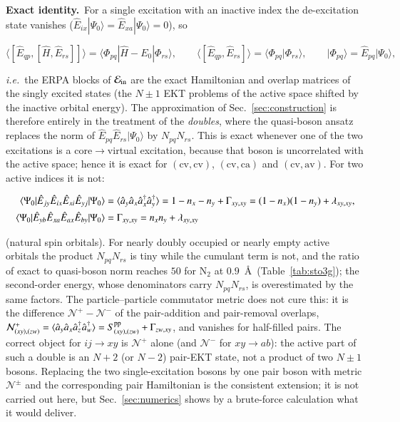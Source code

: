\documentclass[aip,jcp,reprint,noshowkeys,superscriptaddress]{revtex4-1}
\newcommand{\ie}{\textit{i.e.}}
\newcommand{\cre}[1]{\Hat{a}_{#1}^{\dag}}
\newcommand{\ani}[1]{\Hat{a}_{#1}}
\newcommand{\pp}{\text{pp}}
\newcommand{\scv}{\text{cv}}
\newcommand{\sca}{\text{ca}}
\newcommand{\sav}{\text{av}}
\newcommand{\Exact}{\textbf{Exact identity.}\ }
\begin{document}
\Exact For a single excitation with an inactive index the de-excitation
state vanishes ($\hat E_{ix}|\Psi_0\rangle=\hat E_{xa}|\Psi_0\rangle=0$), so
\begin{widetext}
\begin{equation}
  \langle[\hat E_{qp},[\hat H,\hat E_{rs}]]\rangle
  =\langle\Phi_{pq}|\hat H-E_0|\Phi_{rs}\rangle ,\qquad
  \langle[\hat E_{qp},\hat E_{rs}]\rangle=\langle\Phi_{pq}|\Phi_{rs}\rangle,
  \qquad |\Phi_{pq}\rangle=\hat E_{pq}|\Psi_0\rangle ,
  \label{eq:tda-exact}
\end{equation}
\end{widetext}
\ie\ the ERPA blocks of $\mathcal E_{\rm in}$ are the exact Hamiltonian and
overlap matrices of the singly excited states (the $N{\pm}1$ EKT problems of
the active space shifted by the inactive orbital energy).  The
approximation of Sec.~\ref{sec:construction} is therefore entirely in the
treatment of the \emph{doubles}, where the quasi-boson ansatz replaces the
norm of $\hat E_{pq}\hat E_{rs}|\Psi_0\rangle$ by $N_{pq}N_{rs}$.  This is
exact whenever one of the two excitations is a core$\to$virtual excitation,
because that boson is uncorrelated with the active space; hence it is exact
for $(\scv,\scv)$, $(\scv,\sca)$ and $(\scv,\sav)$.  For two active indices
it is not:
\begin{widetext}
\begin{align}
  \langle\Psi_0|\hat E_{jy}\hat E_{ix}\hat E_{xi}\hat E_{yj}|\Psi_0\rangle
  &=\langle\ani{y}\ani{x}\cre{x}\cre{y}\rangle=1-n_x-n_y+\Gamma_{xy,xy}
  =(1-n_x)(1-n_y)+\lambda_{xy,xy},
  \label{eq:norm-caca}\\
  \langle\Psi_0|\hat E_{yb}\hat E_{xa}\hat E_{ax}\hat E_{by}|\Psi_0\rangle
  &=\Gamma_{xy,xy}=n_xn_y+\lambda_{xy,xy}
  \label{eq:norm-avav}
\end{align}
\end{widetext}
(natural spin orbitals).  For nearly doubly occupied or nearly empty active
orbitals the product $N_{pq}N_{rs}$ is tiny while the cumulant term is not,
and the ratio of exact to quasi-boson norm reaches $50$ for N$_2$ at
$0.9$~\AA\ (Table~\ref{tab:sto3g}); the second-order energy, whose
denominators carry $N_{pq}N_{rs}$, is overestimated by the same factors.  The
particle--particle commutator metric does not cure this: it is the
difference $\mathcal N^{+}-\mathcal N^{-}$ of the pair-addition and
pair-removal overlaps, $\mathcal N^{+}_{(xy),(zw)}=\langle\ani{y}\ani{x}\cre{z}\cre{w}\rangle=S^{\pp}_{(xy),(zw)}+\Gamma_{zw,xy}$,
and vanishes for half-filled pairs.  The correct object for
$ij\to xy$ is $\mathcal N^{+}$ alone (and $\mathcal N^{-}$ for $xy\to ab$):
the active part of such a double is an $N{+}2$ (or $N{-}2$) pair-EKT state,
not a product of two $N{\pm}1$ bosons.  Replacing the two single-excitation
bosons by one pair boson with metric $\mathcal N^{\pm}$ and the corresponding
pair Hamiltonian is the consistent extension; it is not carried out here,
but Sec.~\ref{sec:numerics} shows by a brute-force calculation what it would
deliver.
\end{document}
